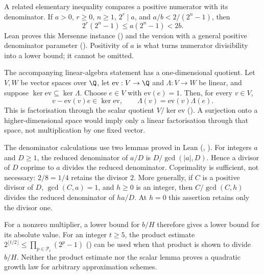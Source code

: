 A related elementary inequality compares a positive numerator with its
denominator. If $a>0$, $r\ge0$, $n\ge1$, $2^r\mid a$, and
$a/b<2/(2^n-1)$, then
\[
 2^r(2^n-1)\le a(2^n-1)<2b.
\]
Lean proves this Mersenne instance
()
and the version with a general positive denominator parameter
().
Positivity of $a$ is what turns numerator divisibility into a lower
bound; it cannot be omitted.

The accompanying linear-algebra statement has a one-dimensional
quotient. Let $V,W$ be vector spaces over $\Q$, let
$\mathrm{ev}:V\to\Q$ and $\Lambda:V\to W$ be linear, and suppose
$\ker\mathrm{ev}\subseteq\ker\Lambda$. Choose $e\in V$ with
$\mathrm{ev}(e)=1$. Then, for every $v\in V$,
\[
 v-\mathrm{ev}(v)e\in\ker\mathrm{ev},\qquad
 \Lambda(v)=\mathrm{ev}(v)\Lambda(e).
\]
This is factorisation through the scalar quotient $V/\ker\mathrm{ev}$
().
A surjection onto a higher-dimensional space would imply only a linear
factorisation through that space, not multiplication by one fixed vector.

The denominator calculations use two lemmas proved in Lean
(,
).
For integers $a$ and $D\ge1$, the reduced denominator of $a/D$ is
$D/\gcd(|a|,D)$. Hence a divisor of $D$ coprime to $a$ divides the
reduced denominator. Coprimality is sufficient, not necessary: $2/8=1/4$
retains the divisor $2$. More generally, if $C$ is a positive divisor of $D$, $\gcd(C,a)=1$,
and $h\ge0$ is an integer, then $C/\gcd(C,h)$ divides the reduced
denominator of $ha/D$. At $h=0$ this assertion retains only the divisor
one.

For a nonzero multiplier, a lower bound for $b/H$ therefore gives a
lower bound for its absolute value. For an integer $t\ge5$, the product estimate
\(2^{\lfloor t/2\rfloor}\le\prod_{p\in\mathcal P_t}(2^p-1)\)
()
can be used when that product is shown to divide $b/H$.
Neither the product estimate nor the scalar lemma proves a quadratic
growth law for arbitrary approximation schemes.

